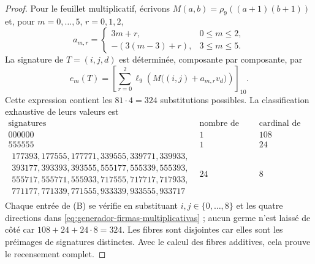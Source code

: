 \begin{proof}
Pour le feuillet multiplicatif, écrivons
\(M(a,b)=\rho_9((a+1)(b+1))\) et, pour \(m=0,\ldots,5\), \(r=0,1,2\),
\[
 a_{m,r}=\begin{cases}
 3m+r,&0\le m\le2,\\
 -(3(m-3)+r),&3\le m\le5.
 \end{cases}
\]
La signature de \(T=(i,j,d)\) est déterminée, composante par composante, par
\begin{equation}
 e_m(T)=\left[\sum_{r=0}^{2}
 \ell_9\!\left(M\bigl((i,j)+a_{m,r}v_d\bigr)\right)\right]_{10}.
 \label{eq:generador-firmas-multiplicativas}
\end{equation}
Cette expression contient les \(81\cdot4=324\) substitutions possibles. La
classification exhaustive de leurs valeurs est
\begingroup
\setlength{\arraycolsep}{4.5pt}
\[
\begin{array}{c|c|c}
\text{signatures}&\text{nombre de signatures}&\text{cardinal de chaque fibre}\\ \hline
000000&1&108\\
555555&1&24\\
\begin{gathered}
177393,177555,177771,339555,339771,339933,\\
393177,393393,393555,555177,555339,555393,\\
555717,555771,555933,717555,717717,717933,\\
771177,771339,771555,933339,933555,933717
\end{gathered}&24&8
\end{array}
\tag{B}
\label{eq:tabla-firmas-multiplicativas}
\]
\endgroup
Chaque entrée de (B) se vérifie en substituant \(i,j\in\{0,\ldots,8\}\) et
les quatre directions dans \eqref{eq:generador-firmas-multiplicativas} ; aucun
germe n’est laissé de côté car
\(108+24+24\cdot8=324\). Les fibres sont disjointes car elles sont les préimages de
signatures distinctes. Avec le calcul des fibres additives, cela prouve le
recensement complet.
\end{proof}

